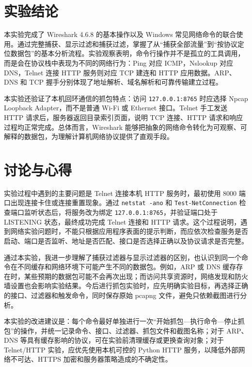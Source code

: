 \documentclass[UTF8,a4paper,zihao=-4]{ctexart}
\begin{document}
\section{实验结论}
本实验完成了 Wireshark 4.6.8 的基本操作以及 Windows 常见网络命令的联合使用。通过完整捕获、显示过滤和捕获过滤，掌握了从“捕获全部流量”到“按协议定位数据包”的基本分析流程。实验观察表明，命令行操作并不是孤立的工具调用，而是会在协议栈中表现为不同的网络行为：Ping 对应 ICMP，Nslookup 对应 DNS，Telnet 连接 HTTP 服务则对应 TCP 建连和 HTTP 应用数据。ARP、DNS 和 TCP 握手分别体现了地址解析、域名解析和可靠传输建立过程。

本实验还验证了本机回环通信的抓包特点：访问 \texttt{127.0.0.1:8765} 时应选择 Npcap Loopback Adapter，而不是普通 Wi-Fi 或 Ethernet 接口。Telnet 手工发送 HTTP 请求后，服务器返回目录索引页面，说明 TCP 连接、HTTP 请求和响应过程均正常完成。总体而言，Wireshark 能够把抽象的网络命令转化为可观察、可解释的数据包，为理解计算机网络协议提供了直观手段。

\section{讨论与心得}
实验过程中遇到的主要问题是 Telnet 连接本机 HTTP 服务时，最初使用 8000 端口出现连接卡住或连接重置现象。通过 \texttt{netstat -ano} 和 \texttt{Test-NetConnection} 检查端口监听状态后，将服务改为绑定 \texttt{127.0.0.1:8765}，并验证端口处于 LISTENING 状态，最终成功完成 Telnet 连接和 HTTP 请求。这个过程说明，遇到网络实验问题时，不能只根据应用程序表面的提示判断，而应依次检查服务是否启动、端口是否监听、地址是否匹配、接口是否选择正确以及协议请求是否完整。

通过本实验，我进一步理解了捕获过滤器与显示过滤器的区别，也认识到同一个命令在不同缓存和网络环境下可能产生不同的数据包。例如，ARP 或 DNS 缓存存在时，某些预期的数据包可能不会再次出现；而访问共享资源时，网络发现和防火墙设置也会影响实验结果。今后进行抓包实验时，应先明确实验目标，再选择正确的接口、过滤器和触发命令，同时保存原始 pcapng 文件，避免只依赖截图进行分析。

本实验的改进建议是：每个命令最好单独进行一次“开始抓包—执行命令—停止抓包”的操作，并统一记录命令、接口、过滤器、抓包文件和截图名称；对于 ARP、DNS 等具有缓存影响的协议，可在实验前清理缓存或更换查询对象；对于 Telnet/HTTP 实验，应优先使用本机可控的 Python HTTP 服务，以降低外部网络不可达、HTTPS 加密和服务器策略造成的不确定性。
\end{document}
